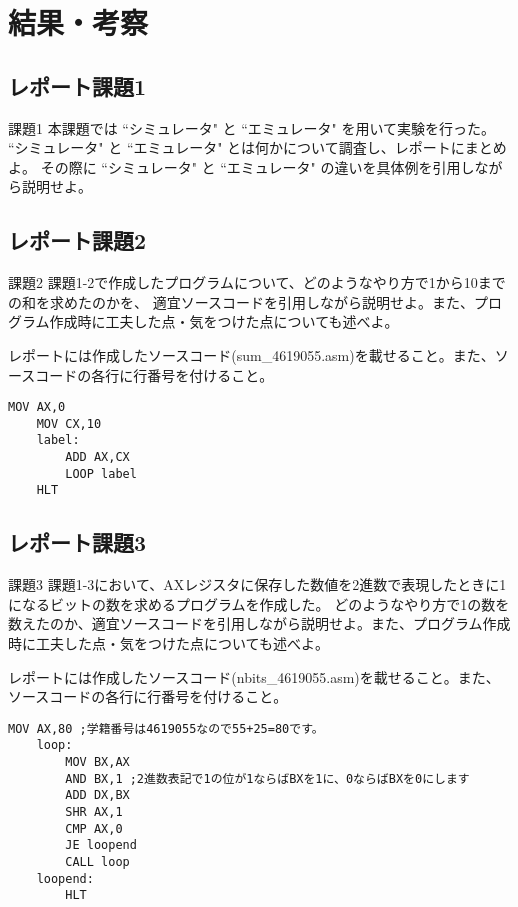 \documentclass[12pt]{jarticle}
\begin{document}
\clearpage

\section{結果・考察}
\subsection{レポート課題1}
\begin{itembox}[l]{課題1}
	本課題では ``シミュレータ" と ``エミュレータ" を用いて実験を行った。
	``シミュレータ" と ``エミュレータ" とは何かについて調査し、レポートにまとめよ。
	その際に ``シミュレータ" と ``エミュレータ" の違いを具体例を引用しながら説明せよ。
\end{itembox}

\subsection{レポート課題2}
\begin{itembox}[l]{課題2}
	課題1-2で作成したプログラムについて、どのようなやり方で1から10までの和を求めたのかを、
	適宜ソースコードを引用しながら説明せよ。また、プログラム作成時に工夫した点・気をつけた点についても述べよ。

	レポートには作成したソースコード(sum\_4619055.asm)を載せること。また、ソースコードの各行に行番号を付けること。
\end{itembox}

\begin{lstlisting}[caption=sum\_4619055.asm,label=sum]
	MOV AX,0
	MOV CX,10
	label:
		ADD AX,CX
		LOOP label
	HLT
\end{lstlisting}


\subsection{レポート課題3}
\begin{itembox}[l]{課題3}
	課題1-3において、AXレジスタに保存した数値を2進数で表現したときに1になるビットの数を求めるプログラムを作成した。
	どのようなやり方で1の数を数えたのか、適宜ソースコードを引用しながら説明せよ。また、プログラム作成時に工夫した点・気をつけた点についても述べよ。

	レポートには作成したソースコード(nbits\_4619055.asm)を載せること。また、ソースコードの各行に行番号を付けること。
\end{itembox}

\begin{lstlisting}[caption=nbits\_4619055.asm,label=nbits]
	MOV AX,80 ;学籍番号は4619055なので55+25=80です。
	loop:
		MOV BX,AX
		AND BX,1 ;2進数表記で1の位が1ならばBXを1に、0ならばBXを0にします
		ADD DX,BX
		SHR AX,1
		CMP AX,0
		JE loopend
		CALL loop
	loopend: 
		HLT
\end{lstlisting}
\end{document}
